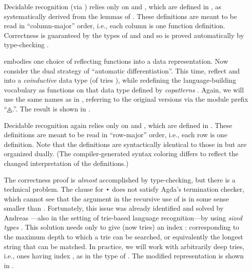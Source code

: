 \documentclass[acmsmall,screen]{acmart}
\begin{document}
Decidable recognition (via {}) relies only on  and , which are defined in , as systematically derived from the lemmas of .
These definitions are meant to be read in ``column-major'' order, i.e., each column is one function definition.
Correctness is guaranteed by the types of  and  and so is proved automatically by type-checking .

\rnc{}

\rnc{}

 embodies one choice of reflecting functions into a data representation.
Now consider the dual strategy of ``automatic differentiation''.
This time, reflect  and  into a \emph{coinductive} data type (of tries \needcite{}), while redefining the language-building vocabulary as functions on that data type defined by \emph{copatterns} \citep{AbelPientka2016}.
Again, we will use the same names as in , referring to the original versions via the module prefix ``{◬.}\hspace{0.05em}''.
The result is shown in .

Decidable recognition again relies only on  and , which are defined in .
These definitions are meant to be read in ``row-major'' order, i.e., each row is one definition.
Note that the definitions are syntactically identical to those in  but are organized dually.
(The compiler-generated syntax coloring differs to reflect the changed interpretation of the definitions.)

The correctness proof is \emph{almost} accomplished by type-checking, but there is a technical problem.
The  clause for { \AF ⋆ } does not satisfy Agda's termination checker, which cannot see that the argument {  } in the recursive use of  is in some sense smaller than .
Fortunately, this issue was already identified and solved by Andreas \citet{Abel2016}---also in the setting of trie-based language recognition---by using \emph{sized types} \citep{Abel2008, AbelPientka2016}.
\rnc{}
This solution needs only to give  (now tries) an index { \AK : } corresponding to the maximum depth to which a trie can be searched, or equivalently the longest string that can be matched.
In practice, we will work with arbitrarily deep tries, i.e., ones having index , as in the type of {}.
The modified representation is shown in .
\end{document}
